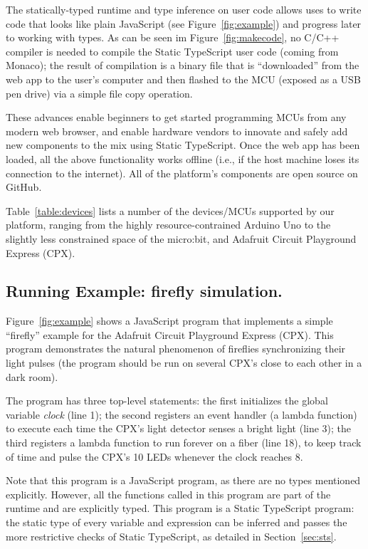 The statically-typed runtime and type inference on user code allows uses to write code
that looks like plain JavaScript (see Figure~\ref{fig:example}) and progress later to working
with types. As can be seen im Figure~\ref{fig:makecode}, 
no C/C++ compiler is needed to compile the Static TypeScript user code (coming from Monaco);
the result of compilation is a binary file that is ``downloaded'' from the web app to the user's
computer and then flashed to the MCU (exposed as a USB pen drive)
via a simple file copy operation.

These advances enable beginners to get started programming MCUs from
any modern web browser, and enable hardware vendors to innovate and safely add new
components to the mix using Static TypeScript.
Once the web app has been loaded, all the above functionality works offline
(i.e., if the host machine loses its connection
to the internet). All of the platform's components are open source on GitHub.

Table~\ref{table:devices} lists a number of the devices/MCUs supported by our platform,
ranging from the highly resource-contrained Arduino Uno to the slightly less constrained space of
the micro:bit, and Adafruit Circuit Playground Express (CPX).

\subsection{Running Example: firefly simulation.}

Figure~\ref{fig:example} shows a JavaScript
program that implements a simple ``firefly'' example
for the Adafruit Circuit Playground Express (CPX).
This program demonstrates the natural phenomenon
of fireflies synchronizing their light pulses (the program should be
run on several CPX's close to each other in a dark room).

The program has three top-level statements:
the first initializes the global variable \emph{clock} (line 1); the
second registers an event handler (a lambda function) to execute
each time the CPX's light detector senses a bright light (line 3); the
third registers a lambda function to run forever on a fiber (line 18),
to keep track of time and pulse the CPX's 10 LEDs whenever the
clock reaches 8.

Note that this program is a JavaScript program, as there are no
types mentioned explicitly. However, all the functions called in
this program are part of the runtime and are explicitly
typed. This program is a Static TypeScript program:
the static type of every variable and expression
can be inferred and passes the more restrictive checks
of Static TypeScript, as detailed in Section~\ref{sec:sts}.


